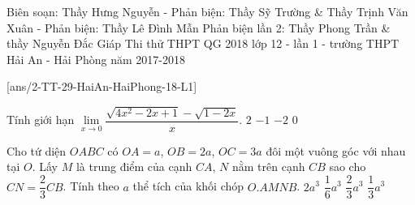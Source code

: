 
\begin{name}
	{Biên soạn: Thầy Hưng Nguyễn - Phản biện: Thầy Sỹ Trường \& Thầy Trịnh Văn Xuân - Phản biện: Thầy Lê Đình Mẫn 
	Phản biện lần 2: Thầy Phong Trần \& thầy Nguyễn Đắc Giáp}
	{Thi thử THPT QG 2018 lớp 12 - lần 1 - trường THPT Hải An - Hải Phòng năm 2017-2018}
\end{name}
\setcounter{ex}{0}
[ans/2-TT-29-HaiAn-HaiPhong-18-L1]
\begin{ex}%
	Tính giới hạn $\lim\limits_{x\rightarrow 0}\dfrac{\sqrt{4x^2-2x+1}-\sqrt{1-2x}}{x}$.
	\choice
	{$2$}
	{$-1$}
	{$-2$}
	{\True $0$}
\end{ex}

\begin{ex}%
	Cho tứ diện $OABC$ có $OA=a$, $OB=2a$, $OC=3a$ đôi một vuông góc với nhau tại $O$. Lấy $M$ là trung điểm của cạnh $CA$, $N$ nằm trên cạnh $CB$ sao cho $CN=\dfrac{2}{3}CB$. Tính theo $a$ thể tích của khối chóp $O.AMNB$.
	\choice
	{$2a^3$}
	{$\dfrac{1}{6}a^3$}
	{\True $\dfrac{2}{3}a^3$}
	{$\dfrac{1}{3}a^3$}
\end{ex}


